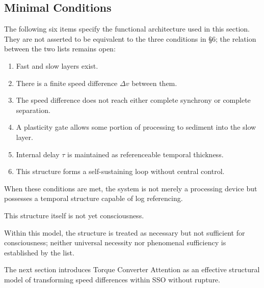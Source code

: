 \subsection{Minimal Conditions}


The following six items specify the functional architecture used in this section. They are not asserted to be equivalent to the three conditions in §6; the relation between the two lists remains open:

\begin{enumerate}
\item Fast and slow layers exist.
\item There is a finite speed difference $\Delta v$ between them.
\item The speed difference does not reach either complete synchrony or complete separation.
\item A plasticity gate allows some portion of processing to sediment into the slow layer.
\item Internal delay $\tau$ is maintained as referenceable temporal thickness.
\item This structure forms a self-sustaining loop without central control.
\end{enumerate}

When these conditions are met, the system is not merely a processing device but possesses a temporal structure capable of log referencing.

This structure itself is not yet consciousness.

Within this model, the structure is treated as necessary but not sufficient for consciousness; neither universal necessity nor phenomenal sufficiency is established by the list.

The next section introduces Torque Converter Attention as an effective structural model of transforming speed differences within SSO without rupture.
